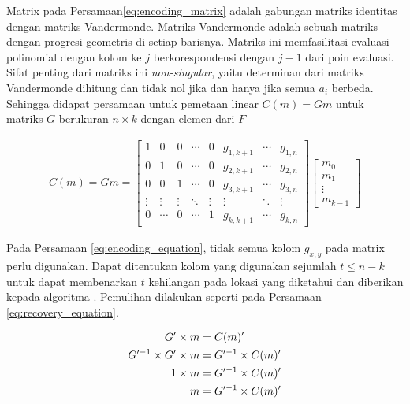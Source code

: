 Matrix pada Persamaan\ref{eq:encoding_matrix} adalah gabungan matriks identitas dengan matriks Vandermonde. Matriks Vandermonde adalah sebuah matriks dengan progresi geometris di setiap barisnya. Matriks ini memfasilitasi evaluasi polinomial dengan kolom ke $j$ berkorespondensi dengan $j - 1$ dari poin evaluasi. Sifat penting dari matriks ini \textit{non-singular}, yaitu determinan dari matriks Vandermonde dihitung dan tidak nol jika dan hanya jika semua $a_i$ berbeda. Sehingga didapat persamaan untuk pemetaan linear $C(m) = Gm$ untuk matriks $G$ berukuran ${n} \times {k}$ dengan elemen dari $F$

\begin{align}
    C(m) = Gm = 
    \begin{bmatrix}
        1 & 0 & 0 & \cdots & 0 & g_{1,k+1} & \cdots & g_{1,n} \\
        0 & 1 & 0 & \cdots & 0 & g_{2,k+1} & \cdots & g_{2,n} \\
        0 & 0 & 1 & \cdots & 0 & g_{3,k+1} & \cdots & g_{3,n} \\
        \vdots & \vdots & \vdots & \ddots & \vdots & \vdots & \ddots & \vdots \\
        0 & \cdots & 0 & \cdots & 1 & g_{k,k+1} & \cdots & g_{k,n}
    \end{bmatrix}
    \begin{bmatrix}
        m_0 \\
        m_1 \\
        \vdots \\
        m_{k-1}
    \end{bmatrix}
    \label{eq:encoding_equation}
\end{align}

Pada Persamaan \ref{eq:encoding_equation}, tidak semua kolom $g_{x,y}$ pada matrix perlu digunakan. Dapat ditentukan kolom yang digunakan sejumlah $t \le n - k$ untuk dapat membenarkan $t$ kehilangan pada lokasi yang diketahui dan diberikan kepada algoritma \parencite{riley2001introduction}. Pemulihan dilakukan seperti pada Persamaan \ref{eq:recovery_equation}.

\begin{align}
    G' \times m &= C(m)' \notag \\
    G'^{-1} \times G' \times m &= G'^{-1} \times C(m)' \notag \\
    1 \times m &= G'^{-1} \times C(m)' \notag \\
    m &= G'^{-1} \times C(m)'
    \label{eq:recovery_equation}
\end{align}

